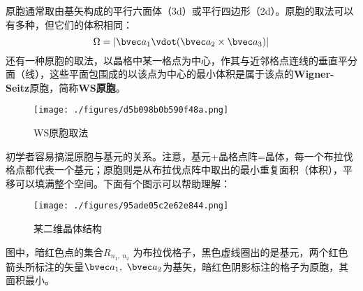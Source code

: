 原胞通常取由基矢构成的平行六面体（3d）或平行四边形（2d）。原胞的取法可以有多种，但它们的体积相同：
\begin{equation}
\Omega = |\bvec a_1 \vdot ( \bvec a_2 \times \bvec a_3)|
\end{equation}
还有一种原胞的取法，以晶格中某一格点为中心，作其与近邻格点连线的垂直平分面（线），这些平面包围成的以该点为中心的最小体积是属于该点的\textbf{Wigner-Seitz}原胞，简称\textbf{WS原胞}。

\begin{figure}[ht]
\centering
\texttt{[image: ./figures/d5b098b0b590f48a.png]}
\caption{WS原胞取法} \label{fig_BraLat_5}
\end{figure}

初学者容易搞混原胞与基元的关系。注意，基元+晶格点阵=晶体，每一个布拉伐格点都代表一个基元；原胞则是从布拉伐点阵中取出的最小重复面积（体积），平移可以填满整个空间。下面有个图示可以帮助理解：
\begin{figure}[ht]
\centering
\texttt{[image: ./figures/95ade05c2e62e844.png]}
\caption{某二维晶体结构} \label{fig_BraLat_4}
\end{figure}
图中，暗红色点的集合${R_{n_1,~ n_2}}$ 为布拉伐格子，黑色虚线圈出的是基元，两个红色箭头所标注的矢量$\bvec a_1,~ \bvec a_2$为基矢，暗红色阴影标注的格子为原胞，其面积最小。

